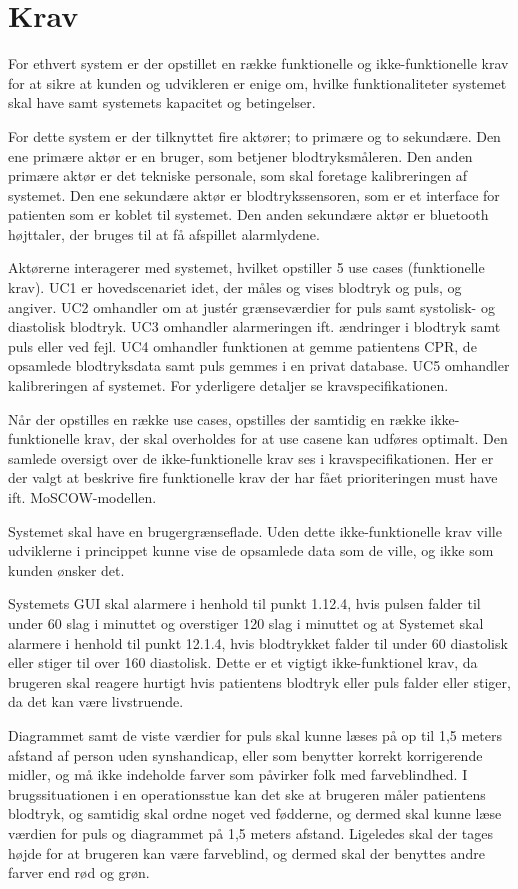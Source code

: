 \section{Krav}
For ethvert system er der opstillet en række funktionelle og ikke-funktionelle krav for at sikre at kunden og udvikleren er enige om, hvilke funktionaliteter systemet skal have samt systemets kapacitet og betingelser.

For dette system er der tilknyttet fire aktører; to primære og to sekundære. Den ene primære aktør er en bruger, som betjener blodtryksmåleren. Den anden primære aktør er det tekniske personale, som skal foretage kalibreringen af systemet. Den ene sekundære aktør er blodtrykssensoren, som er et interface for patienten som er koblet til systemet. Den anden sekundære aktør er bluetooth højttaler, der bruges til at få afspillet alarmlydene.

Aktørerne interagerer med systemet, hvilket opstiller 5 use cases (funktionelle krav). UC1 er hovedscenariet idet, der måles og vises blodtryk og puls, og angiver.  UC2 omhandler om at justér grænseværdier for puls samt systolisk- og diastolisk blodtryk. UC3 omhandler alarmeringen ift. ændringer i blodtryk samt puls eller ved fejl. UC4 omhandler funktionen at gemme patientens CPR, de opsamlede blodtryksdata samt puls gemmes i en privat database. UC5 omhandler kalibreringen af systemet. For yderligere detaljer se kravspecifikationen.

Når der opstilles en række use cases, opstilles der samtidig en række ikke-funktionelle krav, der skal overholdes for at use casene kan udføres optimalt. Den samlede oversigt over de ikke-funktionelle krav ses i kravspecifikationen. Her er der valgt at beskrive fire funktionelle krav der har fået prioriteringen must have ift. MoSCOW-modellen.

Systemet skal have en brugergrænseflade. Uden dette ikke-funktionelle krav ville udviklerne i princippet kunne vise de opsamlede data som de ville, og ikke som kunden ønsker det.

Systemets GUI skal alarmere i henhold til punkt 1.12.4, hvis pulsen
falder til under 60 slag i minuttet og overstiger 120 slag i minuttet  og at Systemet skal
alarmere i henhold til punkt 12.1.4, hvis blodtrykket falder til under 60
diastolisk eller stiger til over 160 diastolisk. Dette er  et vigtigt ikke-funktionel krav, da brugeren skal reagere hurtigt hvis patientens blodtryk eller puls falder eller stiger, da det kan være livstruende.

Diagrammet samt de viste værdier for puls skal kunne læses på op til 1,5 meters afstand af person uden synshandicap, eller som benytter korrekt korrigerende midler, og må ikke indeholde farver som påvirker folk med farveblindhed. I brugssituationen i en operationsstue kan det ske at brugeren måler patientens blodtryk, og samtidig skal ordne noget ved fødderne, og dermed skal kunne læse værdien for puls og diagrammet på 1,5 meters afstand. Ligeledes skal der tages højde for at brugeren kan være farveblind, og dermed skal der benyttes andre farver end rød og grøn.\\